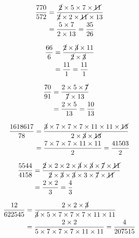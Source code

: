 {{\item\begin{align*}
    \dfrac{770}{572} &=
    \dfrac{\cancel{2} \times 5 \times 7 \times \cancel{11}}
    {\cancel{2} \times 2 \times \cancel{11} \times 13}\\ &=
    \dfrac{5 \times 7}
    {2 \times 13} =
    \dfrac{35}{26}
    \end{align*}

\item\begin{align*}
    \dfrac{66}{6} &=
    \dfrac{\cancel{2} \times \cancel{3} \times 11}
    {\cancel{2} \times \cancel{3}}\\ &=
    \dfrac{11}
    {1} =
    \dfrac{11}{1}
    \end{align*}

\item\begin{align*}
    \dfrac{70}{91} &=
    \dfrac{2 \times 5 \times \cancel{7}}
    {\cancel{7} \times 13}\\ &=
    \dfrac{2 \times 5}
    {13} =
    \dfrac{10}{13}
    \end{align*}

\item\begin{align*}
    \dfrac{1618617}{78} &=
    \dfrac{\cancel{3} \times 7 \times 7 \times 7 \times 11 \times 11 \times \cancel{13}}
    {2 \times \cancel{3} \times \cancel{13}}\\ &=
    \dfrac{7 \times 7 \times 7 \times 11 \times 11}
    {2} =
    \dfrac{41503}{2}
    \end{align*}

\item\begin{align*}
    \dfrac{5544}{4158} &=
    \dfrac{\cancel{2} \times 2 \times 2 \times \cancel{3} \times \cancel{3} \times \cancel{7} \times \cancel{11}}
    {\cancel{2} \times \cancel{3} \times \cancel{3} \times 3 \times \cancel{7} \times \cancel{11}}\\ &=
    \dfrac{2 \times 2}
    {3} =
    \dfrac{4}{3}
    \end{align*}

\item\begin{align*}
    \dfrac{12}{622545} &=
    \dfrac{2 \times 2 \times \cancel{3}}
    {\cancel{3} \times 5 \times 7 \times 7 \times 7 \times 11 \times 11}\\ &=
    \dfrac{2 \times 2}
    {5 \times 7 \times 7 \times 7 \times 11 \times 11} =
    \dfrac{4}{207515}
    \end{align*}

}}
